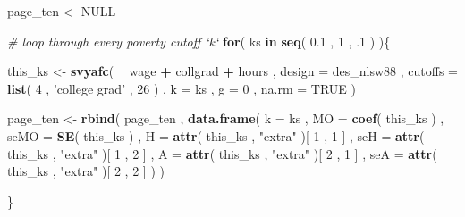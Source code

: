 \documentclass[]{book}
\newenvironment{Shaded}{\begin{snugshade}}{\end{snugshade}}
\newcommand{\CommentTok}[1]{\textcolor[rgb]{0.56,0.35,0.01}{\textit{#1}}}
\newcommand{\ControlFlowTok}[1]{\textcolor[rgb]{0.13,0.29,0.53}{\textbf{#1}}}
\newcommand{\DataTypeTok}[1]{\textcolor[rgb]{0.13,0.29,0.53}{#1}}
\newcommand{\DecValTok}[1]{\textcolor[rgb]{0.00,0.00,0.81}{#1}}
\newcommand{\FloatTok}[1]{\textcolor[rgb]{0.00,0.00,0.81}{#1}}
\newcommand{\KeywordTok}[1]{\textcolor[rgb]{0.13,0.29,0.53}{\textbf{#1}}}
\newcommand{\NormalTok}[1]{#1}
\newcommand{\OperatorTok}[1]{\textcolor[rgb]{0.81,0.36,0.00}{\textbf{#1}}}
\newcommand{\OtherTok}[1]{\textcolor[rgb]{0.56,0.35,0.01}{#1}}
\newcommand{\StringTok}[1]{\textcolor[rgb]{0.31,0.60,0.02}{#1}}
\begin{document}
\begin{Shaded}
\begin{Highlighting}[]
\NormalTok{page_ten <-}\StringTok{ }\OtherTok{NULL}

\CommentTok{# loop through every poverty cutoff `k`}
\ControlFlowTok{for}\NormalTok{( ks }\ControlFlowTok{in} \KeywordTok{seq}\NormalTok{( }\FloatTok{0.1}\NormalTok{ , }\DecValTok{1}\NormalTok{ , }\FloatTok{.1}\NormalTok{ ) )\{}
    
\NormalTok{    this_ks <-}
\StringTok{        }\KeywordTok{svyafc}\NormalTok{(}
            \OperatorTok{~}\StringTok{ }\NormalTok{wage }\OperatorTok{+}\StringTok{ }\NormalTok{collgrad }\OperatorTok{+}\StringTok{ }\NormalTok{hours , }
            \DataTypeTok{design =}\NormalTok{ des_nlsw88 , }
            \DataTypeTok{cutoffs =} \KeywordTok{list}\NormalTok{( }\DecValTok{4}\NormalTok{ , }\StringTok{'college grad'}\NormalTok{ , }\DecValTok{26}\NormalTok{ ) , }
            \DataTypeTok{k =}\NormalTok{ ks , }
            \DataTypeTok{g =} \DecValTok{0}\NormalTok{ , }
            \DataTypeTok{na.rm =} \OtherTok{TRUE} 
\NormalTok{           )}
    
\NormalTok{    page_ten <-}
\StringTok{        }\KeywordTok{rbind}\NormalTok{(}
\NormalTok{            page_ten ,}
            \KeywordTok{data.frame}\NormalTok{( }
                \DataTypeTok{k =}\NormalTok{ ks , }
                \DataTypeTok{MO =} \KeywordTok{coef}\NormalTok{( this_ks ) ,}
                \DataTypeTok{seMO =} \KeywordTok{SE}\NormalTok{( this_ks ) ,}
                \DataTypeTok{H =} \KeywordTok{attr}\NormalTok{( this_ks , }\StringTok{"extra"}\NormalTok{ )[ }\DecValTok{1}\NormalTok{ , }\DecValTok{1}\NormalTok{ ] ,}
                \DataTypeTok{seH =} \KeywordTok{attr}\NormalTok{( this_ks , }\StringTok{"extra"}\NormalTok{ )[ }\DecValTok{1}\NormalTok{ , }\DecValTok{2}\NormalTok{ ] ,}
                \DataTypeTok{A =} \KeywordTok{attr}\NormalTok{( this_ks , }\StringTok{"extra"}\NormalTok{ )[ }\DecValTok{2}\NormalTok{ , }\DecValTok{1}\NormalTok{ ] ,}
                \DataTypeTok{seA =} \KeywordTok{attr}\NormalTok{( this_ks , }\StringTok{"extra"}\NormalTok{ )[ }\DecValTok{2}\NormalTok{ , }\DecValTok{2}\NormalTok{ ]}
\NormalTok{          )}
\NormalTok{        )}
    
\NormalTok{\}}
\end{Highlighting}
\end{Shaded}
\end{document}
